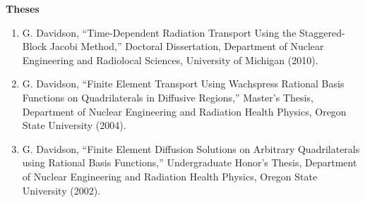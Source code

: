 \documentclass[letterpaper,11pt]{article}
\newcommand{\leftsubheading}[1]{
  \textbf{#1\vspace{-6pt} \\}}
\begin{document}

\leftsubheading{Theses}
\begin{enumerate}
  \item G. Davidson, ``Time-Dependent Radiation Transport Using the
    Staggered-Block Jacobi Method,'' Doctoral Dissertation, Department
    of Nuclear Engineering and Radiolocal Sciences, University of
    Michigan (2010).
  \item G. Davidson, ``Finite Element Transport Using Wachspress
    Rational Basis Functions on Quadrilaterals in Diffusive Regions,''
    Master's Thesis, Department of Nuclear Engineering and Radiation
    Health Physics, Oregon State University (2004).
  \item G. Davidson, ``Finite Element Diffusion Solutions on Arbitrary
    Quadrilaterals using Rational Basis Functions,'' Undergraduate
    Honor's Thesis, Department of Nuclear Engineering and Radiation
    Health Physics, Oregon State University (2002).
\end{enumerate}

\end{document}
